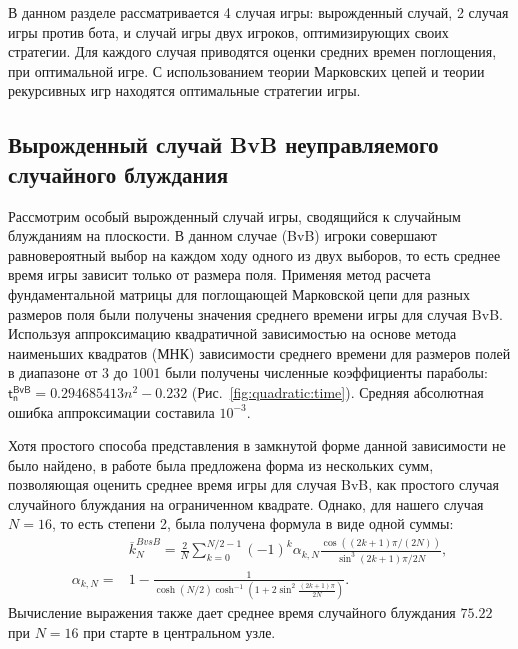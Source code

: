 В данном разделе рассматривается 4 случая игры: вырожденный случай, 2 случая игры против бота, и случай игры двух игроков, оптимизирующих своих стратегии. Для каждого случая приводятся оценки средних времен поглощения, при оптимальной игре. С использованием теории Марковских цепей и теории рекурсивных игр находятся оптимальные стратегии игры.

\subsection{Вырожденный случай BvB неуправляемого случайного блуждания}\label{subsec:ch3/sec3/sub1}

Рассмотрим особый вырожденный случай игры, сводящийся к случайным блужданиям на плоскости. В данном случае (BvB) игроки совершают равновероятный выбор на каждом ходу одного из двух выборов, то есть среднее время игры зависит только от размера поля. Применяя метод расчета фундаментальной матрицы для поглощающей Марковской цепи для разных размеров поля были получены значения среднего времени игры для случая BvB. Используя аппроксимацию квадратичной зависимостью на основе метода наименьших квадратов (МНК) зависимости среднего времени для размеров полей в диапазоне от $3$ до $1001$
были получены численные коэффициенты параболы: $\boldsymbol{\mathsf{t_n^{BvB}}} = 0.294685413 n^2 - 0.232$ (Рис.~\cref{fig:quadratic:time}). Средняя абсолютная ошибка аппроксимации составила $10^{-3}$. 

Хотя простого способа представления в замкнутой форме данной зависимости  не было найдено, в работе \cite{kmet_gamblers_2002} была предложена форма из нескольких сумм, позволяющая оценить
среднее время игры для случая BvB, как простого случая случайного блуждания на ограниченном квадрате. Однако, для нашего случая $N=16$, то есть степени 2, была получена формула в виде одной суммы:
\begin{equation}
	\begin{aligned}
		& \overline{k}_N^{B vs B} = \frac{2}{N} \sum_{k=0}^{N/2-1} (-1)^k \alpha_{k,N} 
		\frac{\cos((2k+1)\pi/(2N))}{\sin^3{(2k+1)\pi/2N}}, \\
		\alpha_{k,N} =& 1-\frac{1}{\cosh(N/2)\cosh^{-1}\left(1+2\sin^2\frac{(2k+1)\pi}{2N}\right)}.
		\label{eq:absorption_bvb_center}
	\end{aligned}
\end{equation}
Вычисление выражения также дает среднее время случайного блуждания $75.22$ при $N=16$ при старте в центральном узле.


